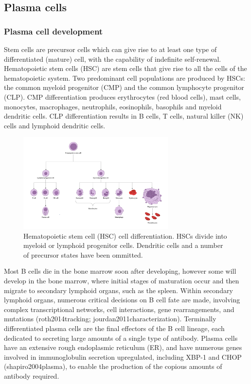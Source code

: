 \subsection{Plasma cells}
\subsubsection{Plasma cell development}
Stem cells are precursor cells which can give rise to at least one type of differentiated (mature) cell, with the capability of indefinite self-renewal.
Hematopoietic stem cells (HSC) are stem cells that give rise to all the cells of the hematopoietic system.
Two predominant cell populations are produced by HSCs: the common myeloid progenitor (CMP) and the common lymphocyte progenitor (CLP).
CMP differentiation produces erythrocytes (red blood cells), mast cells, monocytes, macrophages, neutrophils, eosinophils, basophils and myeloid dendritic cells.
CLP differentiation results in B cells, T cells, natural killer (NK) cells and lymphoid dendritic cells.

\begin{figure}
\centering\includegraphics[width=0.7\textwidth]{figures/Introduction/immune_cells.png}
\caption[Hematopoietic system cell differentiation]{Hematopoietic stem cell (HSC) cell differentiation. HSCs divide into myeloid or lymphoid progenitor cells. Dendritic cells and a number of precursor states have been ommitted. }
\label{fig:HSC_differentiation}\end{figure}

Most B cells die in the bone marrow soon after developing, however some will develop in the bone marrow, where initial stages of maturation occur and then migrate to secondary lymphoid organs, such as the spleen. Within secondary lymphoid organs, numerous critical decisions on B cell fate are made, involving complex transcriptional networks, cell interactions, gene rearrangements, and mutations (roth2014tracking; jourdan2011characterization). Terminally differentiated plasma cells are the final effectors of the B cell lineage, each dedicated to secreting large amounts of a single type of antibody. Plasma cells have an extensive rough endoplasmic reticulum (ER), and have numerous genes involved in immunoglobulin secretion upregulated, including XBP-1 and CHOP (shapiro2004plasma), to enable the production of the copious amounts of antibody required.



